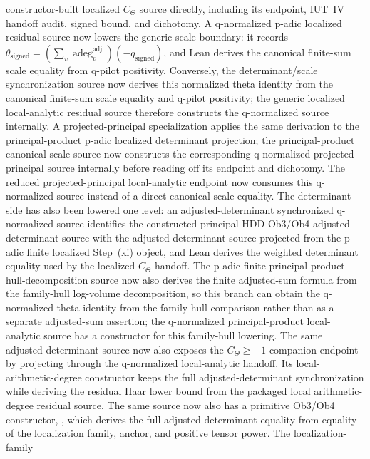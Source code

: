\documentclass[11pt]{article}
\theoremstyle{plain}
\theoremstyle{definition}
\theoremstyle{remark}
\begin{document}
constructor-built localized \(C_\Theta\) source directly, including its endpoint,
IUT~IV handoff audit, signed bound, and dichotomy.  A q-normalized p-adic
localized residual source now lowers the generic scale boundary: it records
\(\theta_{\mathrm{signed}}=(\sum_v \operatorname{adeg}^{\mathrm{adj}}_v)
(-q_{\mathrm{signed}})\), and Lean derives the canonical finite-sum scale
equality from q-pilot positivity.  Conversely, the determinant/scale
synchronization source now derives this normalized theta identity from the
canonical finite-sum scale equality and q-pilot positivity; the generic
localized local-analytic residual source therefore constructs the q-normalized
source internally.  A projected-principal specialization applies the same
derivation to the principal-product p-adic localized determinant projection;
the principal-product canonical-scale source now constructs the corresponding
q-normalized projected-principal source internally before reading off its
endpoint and dichotomy.  The reduced projected-principal local-analytic endpoint
now consumes this q-normalized source instead of a direct canonical-scale
equality.
The determinant side has also been lowered one level: an
adjusted-determinant synchronized q-normalized source identifies the constructed
principal HDD Ob3/Ob4 adjusted determinant source with the adjusted determinant
source projected from the p-adic finite localized Step~(xi) object, and Lean
derives the weighted determinant equality used by the localized \(C_\Theta\)
handoff.  The p-adic finite principal-product hull-decomposition source now
also derives the finite adjusted-sum formula from the family-hull log-volume
decomposition, so this branch can obtain the q-normalized theta identity from
the family-hull comparison rather than as a separate adjusted-sum assertion;
the q-normalized principal-product local-analytic source has a constructor for
this family-hull lowering.
The same adjusted-determinant source now also exposes the
\(C_\Theta \geq -1\) companion endpoint by projecting through the q-normalized
local-analytic handoff.  Its local-arithmetic-degree constructor keeps the full
adjusted-determinant synchronization while deriving the residual Haar lower
bound from the packaged local arithmetic-degree residual source.  The same
source now also has a primitive Ob3/Ob4 constructor,
\texttt{},
which derives the full adjusted-determinant equality from equality of the
localization family, anchor, and positive tensor power.  The localization-family
\end{document}
